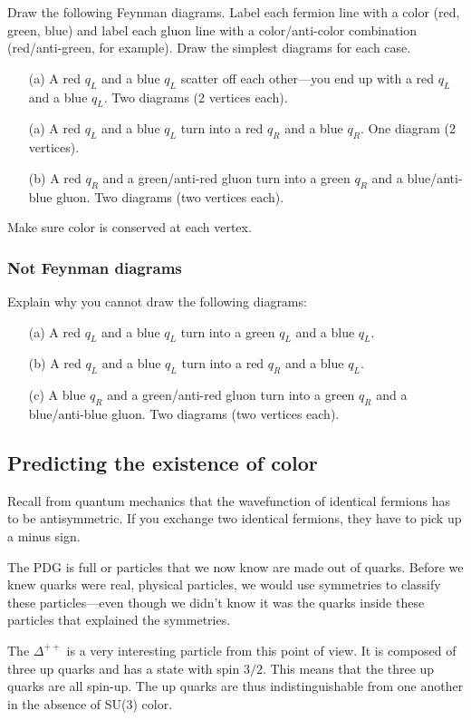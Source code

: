 \documentclass[12pt]{article}
\begin{document}
Draw the following Feynman diagrams. Label each fermion line with a color (red, green, blue) and label each gluon line with a color/anti-color combination (red/anti-green, for example).  Draw the simplest diagrams for each case.
\begin{enumerate}
	\item[(a)] A red $q_L$ and a blue $q_L$ scatter off each other---you end up with a red $q_L$ and a blue $q_L$. Two diagrams (2 vertices each). 
	\item[(a)] A red $q_L$ and a blue $q_L$ turn into a red $q_R$ and a blue $q_R$. One diagram (2 vertices). 
	\item[(b)] A red $q_R$ and a green/anti-red gluon turn into a green $q_R$ and  a blue/anti-blue gluon. Two diagrams (two vertices each). 
\end{enumerate}
Make sure color is conserved at each vertex.


\subsubsection{Not Feynman diagrams}

Explain why you cannot draw the following diagrams:
\begin{enumerate}
	\item[(a)] A red $q_L$ and a blue $q_L$ turn into a green $q_L$ and a blue $q_L$. 
	\item[(b)] A red $q_L$ and a blue $q_L$ turn into a red $q_R$ and a blue $q_L$. 
	\item[(c)] A blue $q_R$ and a green/anti-red gluon turn into a green $q_R$ and a blue/anti-blue gluon. Two diagrams (two vertices each). 
\end{enumerate}


\subsection{Predicting the existence of color}

Recall from quantum mechanics that the wavefunction of identical fermions has to be antisymmetric. If you exchange two identical fermions, they have to pick up a minus sign. 

The PDG is full or particles that we now know are made out of quarks. Before we knew quarks were real, physical particles, we would use symmetries to classify these particles---even though we didn't know it was the quarks inside these particles that explained the symmetries. 

The $\Delta^{++}$ is a very interesting particle from this point of view. It is composed of three up quarks and has a state with spin $3/2$. This means that the three up quarks are all spin-up. The up quarks are thus indistinguishable from one another in the absence of SU(3) color.
\end{document}
